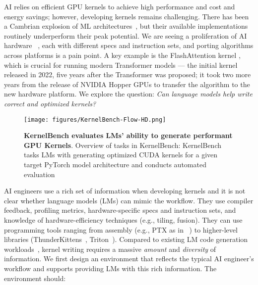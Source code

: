 AI relies on efficient GPU kernels to achieve high performance and cost and energy savings; however, developing kernels remains challenging. 
There has been a Cambrian explosion of ML architectures~\cite{tay2022efficient, peng2023rwkv, dao2024transformers}, but their available implementations routinely underperform their peak potential. We are seeing a proliferation of AI hardware ~\cite{nvidia2017nvidia, nvidia2020nvidia, nvidia2022nvidia, jouppi2023tpuv4opticallyreconfigurable, groq-chip, cerebras-wse, graphcore-ipu}, each with different specs and instruction sets, and porting algorithms across platforms is a pain point. A key example is the FlashAttention kernel \cite{dao2022flashattention}, which is 
crucial for running modern Transformer models –– the initial kernel released in 2022, five years after the Transformer was proposed; it took two more years from the release of NVIDIA Hopper GPUs to transfer the algorithm to the new hardware platform. We explore the question: \textit{Can language models help write correct and optimized kernels?}

\begin{figure*}[!ht]
    \centering
    \texttt{[image: figures/KernelBench-Flow-HD.png]} %
    \vspace{-20pt}
    \caption{\textbf{KernelBench evaluates LMs' ability to generate performant GPU Kernels}. Overview of tasks in KernelBench: KernelBench tasks LMs with generating optimized CUDA kernels for a given target PyTorch model architecture and conducts automated evaluation}
    \vspace{-10pt}
    \label{fig:kernelbench-workflow}
\end{figure*}

AI engineers use a rich set of information when developing kernels and it is not clear whether language models (LMs) can mimic the workflow. They use compiler feedback, profiling metrics, hardware-specific specs and instruction sets, and knowledge of hardware-efficiency techniques (e.g., tiling, fusion). They can use programming tools ranging from assembly (e.g., PTX as in ~\citet{deepseekv3}) to higher-level libraries (ThunderKittens~\cite{spector2023thunderkittens}, Triton~\cite{triton}). Compared to existing LM code generation workloads~\cite{yang2024swe}, kernel writing requires a massive \textit{amount} and \textit{diversity} of information. We first design an environment that reflects the typical AI engineer's workflow and supports providing LMs with this rich information. The environment should:

